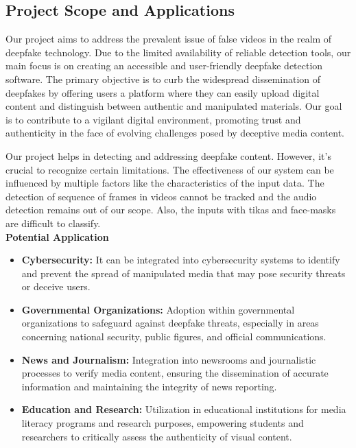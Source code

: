 \subsection{Project Scope and Applications}
Our project aims to address the prevalent issue of false videos in the realm of deepfake technology. Due to the limited availability of reliable detection tools, our main focus is on creating an accessible and user-friendly deepfake detection software. The primary objective is to curb the widespread dissemination of deepfakes by offering users a platform where they can easily upload digital content and distinguish between authentic and manipulated materials. Our goal is to contribute to a vigilant digital environment, promoting trust and authenticity in the face of evolving challenges posed by deceptive media content.

\noindent Our project helps in detecting and addressing deepfake content. However, it's crucial to recognize certain limitations. The effectiveness of our system  can be influenced by multiple factors like the characteristics of the input data. The detection of sequence of frames in videos cannot be tracked and the audio detection remains out of our scope. Also, the inputs with tikas and face-masks are difficult to classify.\\
\newpage
\noindent \textbf{Potential Application}

\begin{itemize}
    \item \textbf{Cybersecurity:} It can be integrated into cybersecurity systems to identify and prevent the spread of manipulated media that may pose security threats or deceive users.

    \item \textbf{Governmental Organizations:} Adoption within governmental organizations to safeguard against deepfake threats, especially in areas concerning national security, public figures, and official communications.

    \item \textbf{News and Journalism:} Integration into newsrooms and journalistic processes to verify media content, ensuring the dissemination of accurate information and maintaining the integrity of news reporting.

    \item \textbf{Education and Research:} Utilization in educational institutions for media literacy programs and research purposes, empowering students and researchers to critically assess the authenticity of visual content.
\end{itemize}